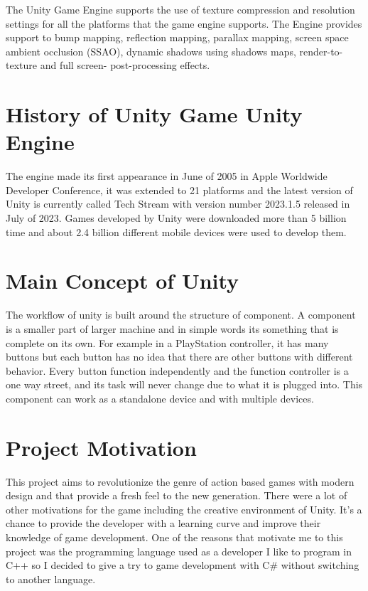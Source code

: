 The Unity Game Engine supports the use of texture compression and resolution settings for all the platforms that the game engine supports. The Engine provides support to bump mapping, reflection mapping, parallax mapping, screen space ambient occlusion (SSAO), dynamic shadows using shadows maps, render-to-texture and full screen- post-processing effects.
\section{History of Unity Game Unity Engine}
The engine made its first appearance in June of 2005 in Apple Worldwide Developer Conference, it was extended to 21 platforms and the latest version of Unity is currently called Tech Stream with version number 2023.1.5 released in July of 2023. Games developed by Unity were downloaded more than 5 billion time and about 2.4 billion different mobile devices were used to develop them.
\section{Main Concept of Unity}
The workflow of unity is built around the structure of component. A component is a smaller part of larger machine and in simple words its something that is complete on its own.
For example in a PlayStation controller, it has many buttons but each button has no idea that there are other buttons with different behavior. Every button function independently and the function controller is a one way street, and its task will never change due to what it is plugged into. This component can work as a standalone device and with multiple devices.
\section{Project Motivation}
This project aims to revolutionize the genre of action based games with modern design and that provide a fresh feel to the new generation. There were a lot of other motivations for the game including the creative environment of Unity. It’s a chance to provide the developer with a learning curve and improve their knowledge of game development. One of the reasons that motivate me to this project was the programming language used as a developer I like to program in C++ so I decided to give a try to game development with C\# without switching to another language.
